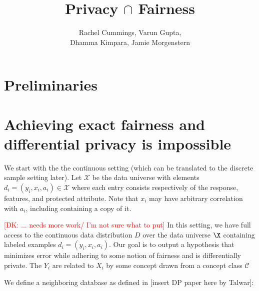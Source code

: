 \documentclass[format = sigconf]{acmart}
\newcommand{\dk}[1]{\textcolor{red}{[DK: #1]}}
\newcommand{\A}{\mathcal{A}}
\renewcommand{\H}{\mathcal{H}}
\renewcommand{\C}{\mathcal{C}}
\newcommand{\1}{\mathbbm{1}}
\theoremstyle{definition}
\begin{document}

\title{Privacy $\cap$ Fairness}
{\author{Rachel Cummings, Varun Gupta, \\Dhamma Kimpara, Jamie Morgenstern}}
\maketitle
\section{Preliminaries}





\section{Achieving exact fairness and differential privacy is impossible}
We start with the the continuous setting (which can be translated to the discrete sample setting later). Let $\mathcal{X}$ be the data universe with elements $d_i = (y_i,x_i,a_i) \in \mathcal{X}$ where each entry consists respectively of the response, features, and protected attribute. Note that $x_i$ may have arbitrary correlation with $a_i$, including containing a copy of it.

\dk {... needs more work/ I'm not sure what to put}
In this setting, we have full access to the continuous data distribution $D$ over the data universe $\X$ containing labeled examples $d_i = (y_i,x_i,a_i)$. Our goal is to output a hypothesis that minimizes error while adhering to some notion of fairness and is differentially private. The $Y_i$ are related to $X_i$ by some concept drawn from a concept class $\C$

We define a neighboring database as defined in [insert DP paper here by Talwar]:
\end{document}
